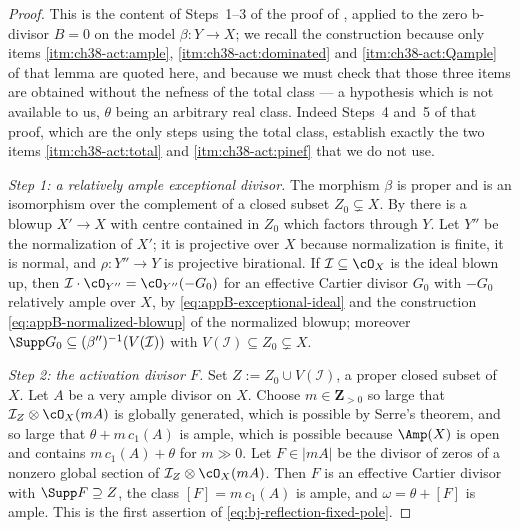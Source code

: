 \begin{proof}
This is the content of Steps~1--3 of the proof of
, applied to the zero b-divisor $B=0$ on the
model $\beta:Y\to X$; we recall the construction because only items
\cref{itm:ch38-act:ample}, \cref{itm:ch38-act:dominated} and
\cref{itm:ch38-act:Qample} of that lemma are quoted here, and because we must
check that those three items are obtained without the nefness of the total
class --- a hypothesis which is not available to us, $\theta$ being an
arbitrary real class.  Indeed Steps~4 and~5 of that proof, which are the
only steps using the total class, establish exactly the two items
\cref{itm:ch38-act:total} and \cref{itm:ch38-act:pinef} that we do not use.

\emph{Step 1: a relatively ample exceptional divisor.}
The morphism $\beta$ is proper and is an isomorphism over the complement
of a closed subset $Z_0\subsetneq X$.  By
 there is a blowup $X'\to X$ with
centre contained in $Z_0$ which factors through $Y$.  Let $Y''$ be the
normalization of $X'$; it is projective over $X$ because normalization
is finite, it is normal, and $\rho:Y''\to Y$ is projective birational.  If
$\mathcal I\subseteq\cO_X$ is the ideal blown up, then
$\mathcal I\cdot\cO_{Y''}=\cO_{Y''}(-G_0)$ for an effective Cartier
divisor $G_0$ with $-G_0$ relatively ample over $X$, by
\eqref{eq:appB-exceptional-ideal} and the construction
\eqref{eq:appB-normalized-blowup} of the normalized blowup; moreover
$\Supp G_0\subseteq(\beta'')^{-1}(V(\mathcal I))$ with
$V(\mathcal I)\subseteq Z_0\subsetneq X$.

\emph{Step 2: the activation divisor $F$.}
Set $Z:=Z_0\cup V(\mathcal I)$, a proper closed subset of $X$.  Let
$A$ be a very ample divisor on $X$.  Choose $m\in\mathbf Z_{>0}$ so
large that $\mathcal I_Z\otimes\cO_X(mA)$ is globally generated, which is
possible by Serre's theorem, and so large that $\theta+m\,c_1(A)$ is
ample, which is possible because $\Amp(X)$ is open and contains
$m\,c_1(A)+\theta$ for $m\gg0$.  Let $F\in|mA|$ be the divisor of
zeros of a nonzero global section of $\mathcal I_Z\otimes\cO_X(mA)$.  Then
$F$ is an effective Cartier divisor with $\Supp F\supseteq Z$, the class
$[F]=m\,c_1(A)$ is ample, and $\omega=\theta+[F]$ is ample.  This is the
first assertion of \eqref{eq:bj-reflection-fixed-pole}.


\end{proof}
